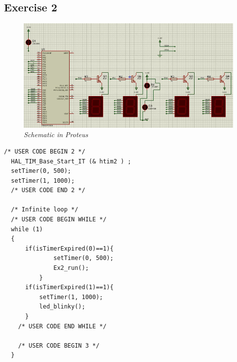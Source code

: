 \subsection{Exercise 2}
\begin{figure}[!htp]
    \centering
    \includegraphics[width=5.5in]{source/picture/bai_2/pic2.jpg}
    \caption{\textit{ Schematic in Proteus}}
    \label{bai2_pic1a}
\end{figure}
\begin{lstlisting}[caption=main.c]
/* USER CODE BEGIN 2 */
  HAL_TIM_Base_Start_IT (& htim2 ) ;
  setTimer(0, 500);
  setTimer(1, 1000);
  /* USER CODE END 2 */

  /* Infinite loop */
  /* USER CODE BEGIN WHILE */
  while (1)
  {
	  if(isTimerExpired(0)==1){
	 		  setTimer(0, 500);
	 		  Ex2_run();
	 	  }
	  if(isTimerExpired(1)==1){
 		  setTimer(1, 1000);
 		  led_blinky();
 	  }
    /* USER CODE END WHILE */

    /* USER CODE BEGIN 3 */
  }
\end{lstlisting}
